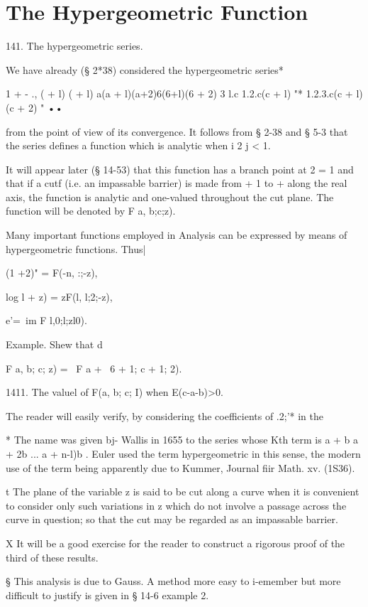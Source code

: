 \chapter{The Hypergeometric Function} 

141. The hypergeometric series.

We have already (§ 2*38) considered the hypergeometric series*

1 + - ., ( + l) ( + l) a(a + l)(a+2)6(6+l)(6 + 2) 3 l.c 1.2.c(c + l)
"* 1.2.3.c(c + l)(c + 2) " ••

from the point of view of its convergence. It follows from § 2-38 and
§ 5-3 that the series defines a function which is analytic when i 2 j
< 1.

It will appear later (§ 14-53) that this function has a branch point
at 2 = 1 and that if a cutf (i.e. an impassable barrier) is made from
+ 1 to + along the real axis, the function is analytic and one-valued
throughout the cut plane. The function will be denoted by F a, b;c;z).

Many important functions employed in Analysis can be expressed by
means of hypergeometric functions. Thus|

(1 +2)" = F(-n, :;-z),

log l + z) = zF(l, l;2;-z),

e'=\ im F l,0;l;zl0).

Example. Shew that d

F a, b; c; z) = ~F a + \, 6 + 1; c + 1; 2).

1411. The valuel of F(a, b; c; I) when E(c-a-b)>0.

The reader will easily verify, by considering the coefficients of
.2;'* in the

* The name was given bj- Wallis in 1655 to the series whose Kth term
is a + b a + 2b ... a + n-l)b . Euler used the term hypergeometric in
this sense, the modern use of the term being apparently due to Kummer,
Journal fiir Math. xv. (1S36).

t The plane of the variable z is said to be cut along a curve when it
is convenient to consider only such variations in z which do not
involve a passage across the curve in question; so that the cut may
be regarded as an impassable barrier.

X It will be a good exercise for the reader to construct a rigorous
proof of the third of these results.

§ This analysis is due to Gauss. A method more easy to i-emember but
more difficult to justify is given in § 14-6 example 2.

